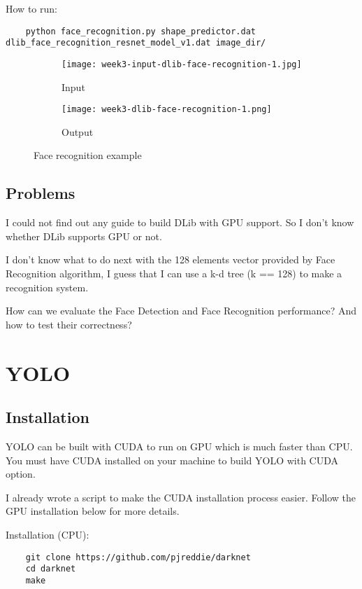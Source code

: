 How to run:
\begin{lstlisting}
    python face_recognition.py shape_predictor.dat 
dlib_face_recognition_resnet_model_v1.dat image_dir/
\end{lstlisting}

\begin{figure}[!ht]
\centering
\begin{subfigure}{0.3\textwidth}
  \centering
  \texttt{[image: week3-input-dlib-face-recognition-1.jpg]}
  \caption{Input}
\end{subfigure}%
\begin{subfigure}{0.7\textwidth}
  \centering
  \texttt{[image: week3-dlib-face-recognition-1.png]}
  \caption{Output}
\end{subfigure}
\caption{Face recognition example}
\end{figure}

\subsection{Problems}
I could not find out any guide to build DLib with GPU support. So I don't know whether DLib supports GPU or not.

I don't know what to do next with the 128 elements vector provided by Face Recognition algorithm, I guess that I can use a k-d tree (k == 128) to make a recognition system.

How can we evaluate the Face Detection and Face Recognition performance? And how to test their correctness?


\newpage
\section{YOLO}
\subsection{Installation}
YOLO can be built with CUDA to run on GPU which is much faster than CPU. You must have CUDA installed on your machine to build YOLO with CUDA option.

I already wrote a script to make the CUDA installation process easier. Follow the GPU installation below for more details.

Installation (CPU):
\begin{lstlisting}
    git clone https://github.com/pjreddie/darknet
    cd darknet
    make
\end{lstlisting}

